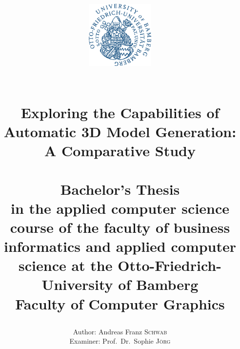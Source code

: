 \title{ 
    \vspace{-4cm}
    \begin{figure}[h]
    \centering
    \includegraphics[width=0.3\textwidth]{figures/ub_logo.png}
    \end{figure}
    \vspace{1cm}
	\HRule{2pt}\\
	\LARGE \textbf{Exploring the Capabilities of Automatic 3D Model Generation: A Comparative Study}\\
	\HRule{2pt}\\
	\vspace{2cm}
	\normalsize Bachelor's Thesis\\
	\vspace{0.5cm}
	in the applied computer science course of the faculty of business informatics and applied computer science at the Otto-Friedrich-University of Bamberg\\
	\vspace{0.5cm}
	Faculty of Computer Graphics\\
	\vspace{4cm} %
}

\date{}

\author{
    \begin{minipage}{\textwidth}
    \begin{flushleft}
    Author: Andreas Franz \textsc{Schwab}\\
    \vspace{0.5cm}
    Examiner: Prof.\ Dr.\ Sophie \textsc{Jörg}
    \end{flushleft}
    \end{minipage}
}

\maketitle
